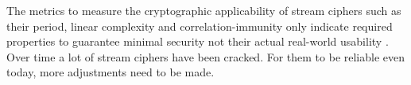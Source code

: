 The metrics to measure the cryptographic applicability of stream ciphers such as their period, linear complexity and correlation-immunity only indicate required properties to guarantee minimal security not their actual real-world usability \cite[p. 24]{coppersmith1993shrinking}. Over time a lot of stream ciphers have been cracked. For them to be reliable even today, more adjustments need to be made.


